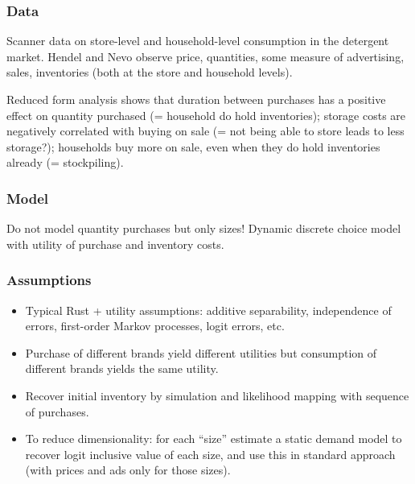 \subsubsection{Data}

Scanner data on store-level and household-level consumption in the detergent market. Hendel and Nevo observe price, quantities, some measure of advertising, sales, inventories (both at the store and household levels).

Reduced form analysis shows that duration between purchases has a positive effect on quantity purchased (= household do hold inventories); storage costs are negatively correlated with buying on sale (= not being able to store leads to less storage?); households buy more on sale, even when they do hold inventories already (= stockpiling).

\subsubsection{Model}

Do not model quantity purchases but only sizes! Dynamic discrete choice model with utility of purchase and inventory costs.

\subsubsection{Assumptions}

\begin{itemize}
\item Typical Rust + utility assumptions: additive separability, independence of errors, first-order Markov processes, logit errors, etc.
\item Purchase of different brands yield different utilities but consumption of different brands yields the same utility.
\item Recover initial inventory by simulation and likelihood mapping with sequence of purchases.
\item To reduce dimensionality: for each ``size'' estimate a static demand model to recover logit inclusive value of each size, and use this in standard approach (with prices and ads only for those sizes).
\end{itemize}


